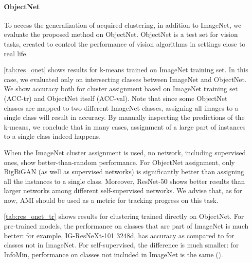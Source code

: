 \documentclass[runningheads]{llncs}
\begin{document}
\paragraph{ObjectNet}
To access the generalization of acquired clustering, in addition to ImageNet, we evaluate the proposed method on ObjectNet. ObjectNet is a test set for vision tasks, created to control the performance of vision algorithms in settings close to real life.

\cref{tab:res_onet} shows results for k-means trained on ImageNet training set. In this case, we evaluated only on intersecting classes between ImageNet and ObjectNet. We show accuracy both for cluster assignment based on ImageNet training set (ACC-tr) and ObjectNet itself (ACC-val). Note that since some ObjectNet classes are mapped to two different ImageNet classes, assigning all images to a single class will result in   accuracy. By manually inspecting the predictions of the k-means, we conclude that in many cases, assignment of a large part of instances to a single class indeed happens.

When the ImageNet cluster assignment is used, no network, including supervised ones, show better-than-random performance. 
For ObjectNet assignment, only BigBiGAN (as well as supervised networks) is significantly better than assigning all the instances to a single class. Moreover, ResNet-50 shows better results than larger networks among different self-supervised networks. We advise that, as for now, AMI should be used as a metric for tracking progress on this task.

\cref{tab:res_onet_tr} shows results for clustering trained directly on ObjectNet.  For pre-trained models, the performance on classes that are part of ImageNet is much better: for example, IG-ResNeXt-101 3248d, has  accuracy as compared to  for classes not in ImageNet. For self-supervised, the difference is much smaller: for InfoMin, performance on classes not included in ImageNet is the same ().
\end{document}
